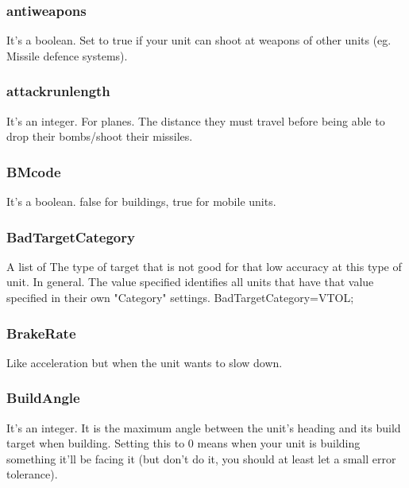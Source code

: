 \documentclass[a4paper,10pt]{article}
\begin{document}
\subsubsection{antiweapons}
It's a boolean. Set to true if your unit can shoot at weapons of other units (eg. Missile defence systems).

\subsubsection{attackrunlength}
It's an integer.
For planes. The distance they must travel before being able to drop their bombs/shoot their missiles.

\subsubsection{BMcode}
It's a boolean. false for buildings, true for mobile units.

\subsubsection{BadTargetCategory}
A list of 
The type of target that is not good for that low accuracy at this type of unit. In general.  The value specified identifies all units that have that value specified in their own "Category" settings. 	BadTargetCategory=VTOL;

\subsubsection{BrakeRate}
Like acceleration but when the unit wants to slow down.

\subsubsection{BuildAngle}
It's an integer. It is the maximum angle between the unit's heading and its build target when building. Setting this to 0 means when your unit is building something it'll be facing it (but don't do it, you should at least let a small error tolerance).
\end{document}
